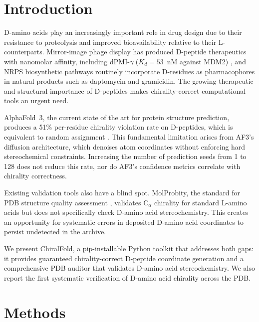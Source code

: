 \documentclass[11pt]{article}
\begin{document}
\section{Introduction}
\label{sec:intro}

D-amino acids play an increasingly important role in drug design due to
their resistance to proteolysis and improved bioavailability relative to
their L-counterparts. Mirror-image phage display has produced D-peptide
therapeutics with nanomolar affinity, including dPMI-$\gamma$
($K_d = 53$~nM against MDM2) \citep{liu2010}, and NRPS biosynthetic
pathways routinely incorporate D-residues as pharmacophores in natural
products such as daptomycin and gramicidin. The growing therapeutic and
structural importance of D-peptides makes chirality-correct computational
tools an urgent need.

AlphaFold~3, the current state of the art for protein structure prediction,
produces a 51\% per-residue chirality violation rate on D-peptides, which is
equivalent to random assignment \citep{childs2025}. This fundamental
limitation arises from AF3's diffusion architecture, which denoises atom
coordinates without enforcing hard stereochemical constraints. Increasing
the number of prediction seeds from 1 to 128 does not reduce this rate,
nor do AF3's confidence metrics correlate with chirality correctness.

Existing validation tools also have a blind spot. MolProbity, the standard
for PDB structure quality assessment \citep{chen2010}, validates
C$_\alpha$ chirality for standard L-amino acids but does not specifically
check D-amino acid stereochemistry. This creates an opportunity for
systematic errors in deposited D-amino acid coordinates to persist
undetected in the archive.

We present ChiralFold, a pip-installable Python toolkit that addresses both
gaps: it provides guaranteed chirality-correct D-peptide coordinate
generation and a comprehensive PDB auditor that validates D-amino acid
stereochemistry. We also report the first systematic verification of
D-amino acid chirality across the PDB.

\section{Methods}
\end{document}
